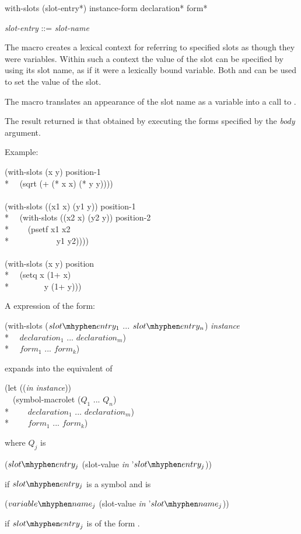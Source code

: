 \begin{defmac}
with-slots ({slot-entry}*) instance-form {declaration}* {form}*

\begin{tabbing}
\emph{slot-entry} ::= \emph{slot-name} {\Mor} 
\end{tabbing}
The macro  creates a lexical context for referring to
specified slots as though they were variables.  Within such a context
the value of the slot can be specified by using its slot name, as if
it were a lexically bound variable.  Both  and 
can be used to set the value of the slot.

The macro  translates an appearance of the slot name as
a variable into a call to .

The result returned is that obtained by executing the forms specified
by the \emph{body} argument.

Example:

\begin{lisp}
(with-slots (x y) position-1 \\*
~~(sqrt (+ (* x x) (* y y)))) \\
\\
(with-slots ((x1 x) (y1 y)) position-1 \\*
~~(with-slots ((x2 x) (y2 y)) position-2 \\*
~~~~(psetf x1 x2 \\*
~~~~~~~~~~~y1 y2)))) \\
\\
(with-slots (x y) position \\*
~~(setq x (1+ x) \\*
~~~~~~~~y (1+ y)))
\end{lisp}

A  expression of the form:
\begin{lisp}
(with-slots ($slot\mhyphen entry_{1}$ ... $slot\mhyphen entry_{n}$) \emph{instance} \\*
~~$declaration_1$ ... $declaration_{m}$) \\*
~~$form_1$ ... $form_{k}$)
\end{lisp}
expands into the equivalent of
\begin{lisp}
(let ((\emph{in} \emph{instance})) \\
~~(symbol-macrolet ($Q_1$ ... $Q_{n}$) \\*
~~~~$declaration_1$ ... $declaration_{m}$) \\*
~~~~$form_1$ ... $form_{k}$)
\end{lisp}
where ${Q}_{j}$ is 
\begin{lisp}
($slot\mhyphen entry_{j}$ (slot-value \emph{in} '$slot\mhyphen entry_{j}$))
\end{lisp}
if $slot\mhyphen entry_{j}$ is a symbol and is
\begin{lisp}
($variable\mhyphen name_{j}$ (slot-value \emph{in} '$slot\mhyphen name_{j}$))
\end{lisp}
if ${slot\mhyphen entry}_{j}$
is of the form .


\end{defmac}
